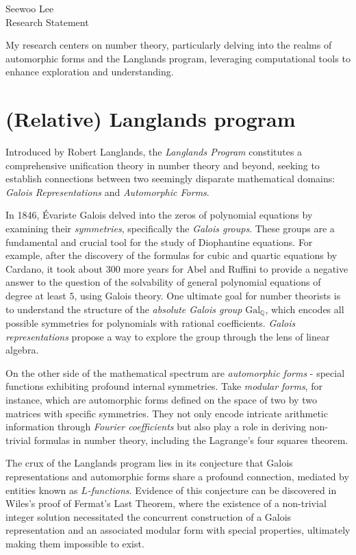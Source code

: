 \documentclass[12pt]{article}
\begin{document}
\noindent Seewoo Lee \\
Research Statement \\
\bigskip



My research centers on number theory, particularly delving into the realms of automorphic forms and the Langlands program, leveraging computational tools to enhance exploration and understanding.


\section*{(Relative) Langlands program}

Introduced by Robert Langlands, the \emph{Langlands Program} constitutes a comprehensive unification theory in number theory and beyond, seeking to establish connections between two seemingly disparate mathematical domains: \emph{Galois Representations} and \emph{Automorphic Forms}.

In 1846, Évariste Galois delved into the zeros of polynomial equations by examining their \emph{symmetries}, specifically the \emph{Galois groups}.
These groups are a fundamental and crucial tool for the study of Diophantine equations.
For example, after the discovery of the formulas for cubic and quartic equations by Cardano, it took about 300 more years for Abel and Ruffini to provide a negative answer to the question of the solvability of general polynomial equations of degree at least $5$, using Galois theory.
One ultimate goal for number theorists is to understand the structure of the \emph{absolute Galois group} $\mathrm{Gal}_{\mathbb{Q}}$, which encodes all possible symmetries for polynomials with rational coefficients.
\emph{Galois representations} propose a way to explore the group through the lens of linear algebra.

On the other side of the mathematical spectrum are \emph{automorphic forms} - special functions exhibiting profound internal symmetries.
Take \emph{modular forms}, for instance, which are automorphic forms defined on the space of two by two matrices with specific symmetries.
They not only encode intricate arithmetic information through \emph{Fourier coefficients} but also play a role in deriving non-trivial formulas in number theory, including the Lagrange's four squares theorem.

The crux of the Langlands program lies in its conjecture that Galois representations and automorphic forms share a profound connection, mediated by entities known as \emph{$L$-functions}.
Evidence of this conjecture can be discovered in Wiles's  proof of Fermat's Last Theorem, where the existence of a non-trivial integer solution necessitated the concurrent construction of a Galois representation and an associated modular form with special properties, ultimately making them impossible to exist.
\end{document}
